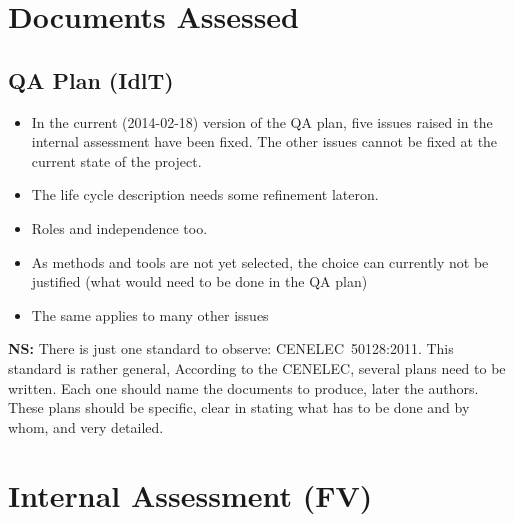 \documentclass[a4paper,german]{article}
\begin{document}
\section{Documents Assessed}
\label{sec:documents-assessed}

\subsection{QA Plan (IdlT)}
\label{sec:qa-plan}

\begin{itemize}
\item In the current (2014-02-18) version of the QA plan, five issues raised
in the internal assessment have been fixed. The other issues cannot be
fixed at the current state of the project.
\item The life cycle description needs some refinement
  lateron.
\item Roles and independence too.
\item As methods and tools are not yet selected, the choice can
  currently not be justified (what would need to be done in the QA plan)
\item The same applies to many other issues
\end{itemize}


\textbf{NS:} There is just one standard to observe:
CENELEC~50128:2011. This standard is rather general, According to the
CENELEC, several plans need to be written. Each one should name the
documents to produce, later the authors. These plans should be
specific, clear in stating what has to be done and by whom, and very
detailed.  

\section{Internal Assessment (FV)}
\label{sec:intern-assessm-fred}
\end{document}
